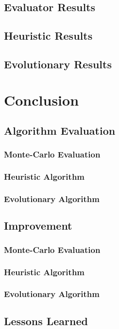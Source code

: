 \documentclass{article}
\begin{document}
\subsection{Evaluator Results}


\subsection{Heuristic Results}


\subsection{Evolutionary Results}


\section{Conclusion}

\subsection{Algorithm Evaluation}


\subsubsection{Monte-Carlo Evaluation}


\subsubsection{Heuristic Algorithm}


\subsubsection{Evolutionary Algorithm}


\subsection{Improvement}

\subsubsection{Monte-Carlo Evaluation}


\subsubsection{Heuristic Algorithm}


\subsubsection{Evolutionary Algorithm}


\subsection{Lessons Learned}
\end{document}
